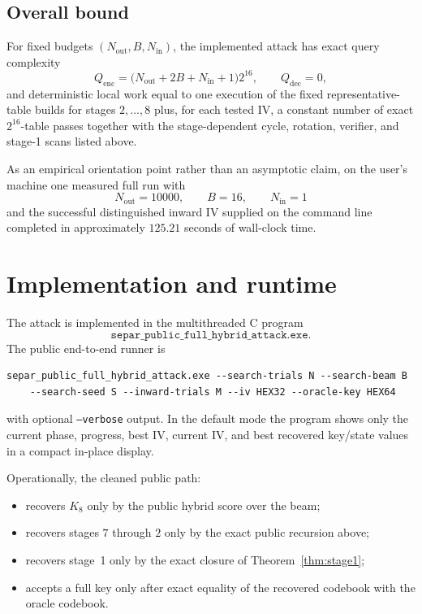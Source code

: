 \documentclass[11pt]{article}
\begin{document}
\subsection{Overall bound}
For fixed budgets $(N_{\mathrm{out}},B,N_{\mathrm{in}})$, the implemented attack has exact query complexity
\[
Q_{\mathrm{enc}}
=
\bigl(N_{\mathrm{out}} + 2B + N_{\mathrm{in}} + 1\bigr)2^{16},
\qquad
Q_{\mathrm{dec}}=0,
\]
and deterministic local work equal to one execution of the fixed representative-table builds for stages $2,\dots,8$ plus, for each tested IV, a constant number of exact $2^{16}$-table passes together with the stage-dependent cycle, rotation, verifier, and stage-1 scans listed above.

As an empirical orientation point rather than an asymptotic claim, on the user's machine one measured full run with
\[
N_{\mathrm{out}}=10000,\qquad B=16,\qquad N_{\mathrm{in}}=1
\]
and the successful distinguished inward IV supplied on the command line completed in approximately $125.21$ seconds of wall-clock time.

\section{Implementation and runtime}
The attack is implemented in the multithreaded C program
\[
\texttt{separ\_public\_full\_hybrid\_attack.exe}.
\]
The public end-to-end runner is
\begin{verbatim}
separ_public_full_hybrid_attack.exe --search-trials N --search-beam B
    --search-seed S --inward-trials M --iv HEX32 --oracle-key HEX64
\end{verbatim}
with optional \texttt{--verbose} output. In the default mode the program shows only the current phase, progress, best IV, current IV, and best recovered key/state values in a compact in-place display.

Operationally, the cleaned public path:
\begin{itemize}[leftmargin=1.5em]
\item recovers $K_8$ only by the public hybrid score over the beam;
\item recovers stages $7$ through $2$ only by the exact public recursion above;
\item recovers stage~1 only by the exact closure of Theorem~\ref{thm:stage1};
\item accepts a full key only after exact equality of the recovered codebook with the oracle codebook.
\end{itemize}
\end{document}
